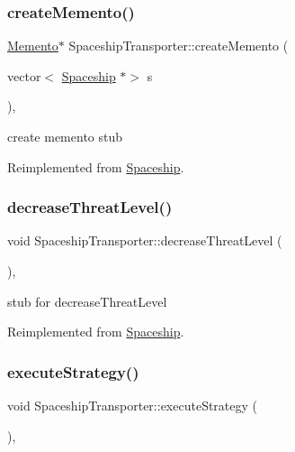 \subsubsection{\texorpdfstring{create\+Memento()}{createMemento()}}
{\footnotesize\ttfamily \hyperlink{classMemento}{Memento}$\ast$ Spaceship\+Transporter\+::create\+Memento (\begin{DoxyParamCaption}\item[{vector$<$ \hyperlink{classSpaceship}{Spaceship} $\ast$$>$}]{s }\end{DoxyParamCaption})\hspace{0.3cm}{\ttfamily [inline]}, {\ttfamily [virtual]}}

create memento stub 

Reimplemented from \hyperlink{classSpaceship_a6d272f846b019dec8226ddab65648a7b}{Spaceship}.

\mbox{\label{classSpaceshipTransporter_aab6415c16cb8e3fd511a995846099068}} 
\subsubsection{\texorpdfstring{decrease\+Threat\+Level()}{decreaseThreatLevel()}}
{\footnotesize\ttfamily void Spaceship\+Transporter\+::decrease\+Threat\+Level (\begin{DoxyParamCaption}{ }\end{DoxyParamCaption})\hspace{0.3cm}{\ttfamily [inline]}, {\ttfamily [virtual]}}

stub for decrease\+Threat\+Level 

Reimplemented from \hyperlink{classSpaceship_a73a1eefd211e9a2063d924ee85f0c0c7}{Spaceship}.

\mbox{\label{classSpaceshipTransporter_a0d8d15f2aba06b89da67a1812d783bfd}} 
\subsubsection{\texorpdfstring{execute\+Strategy()}{executeStrategy()}}
{\footnotesize\ttfamily void Spaceship\+Transporter\+::execute\+Strategy (\begin{DoxyParamCaption}{ }\end{DoxyParamCaption})\hspace{0.3cm}{\ttfamily [inline]}, {\ttfamily [virtual]}}

